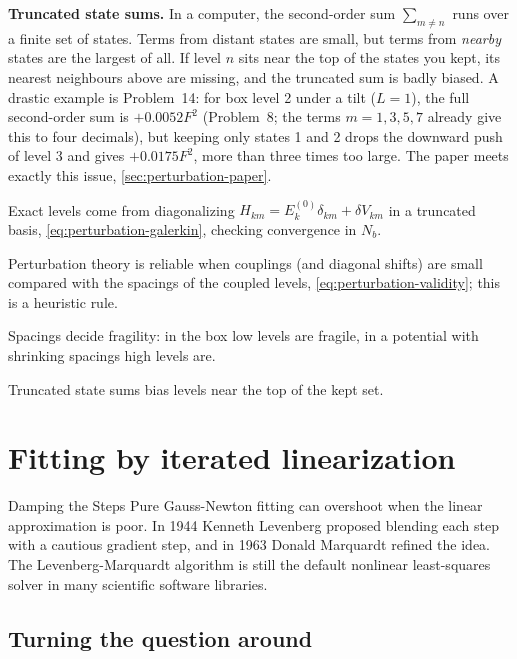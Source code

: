 \begin{pitfall}
\textbf{Truncated state sums.} In a computer, the second-order sum $\sum_{m\ne n}$ runs over a finite set of states. Terms from distant states are small, but terms from \emph{nearby} states are the largest of all. If level $n$ sits near the top of the states you kept, its nearest neighbours above are missing, and the truncated sum is badly biased. A drastic example is Problem~14: for box level 2 under a tilt ($L=1$), the full second-order sum is $+0.0052F^2$ (Problem~8; the terms $m=1,3,5,7$ already give this to four decimals), but keeping only states 1 and 2 drops the downward push of level 3 and gives $+0.0175F^2$, more than three times too large. The paper meets exactly this issue, \cref{sec:perturbation-paper}.
\end{pitfall}

\begin{keyideas}
\item Exact levels come from diagonalizing $H_{km}=E_k^{(0)}\delta_{km}+\delta V_{km}$ in a truncated basis, \cref{eq:perturbation-galerkin}, checking convergence in $N_b$.
\item Perturbation theory is reliable when couplings (and diagonal shifts) are small compared with the spacings of the coupled levels, \cref{eq:perturbation-validity}; this is a heuristic rule.
\item Spacings decide fragility: in the box low levels are fragile, in a potential with shrinking spacings high levels are.
\item Truncated state sums bias levels near the top of the kept set.
\end{keyideas}

\section{Fitting by iterated linearization}\label{sec:perturbation-fitting}
\begin{didyouknow}{Damping the Steps}
Pure Gauss-Newton fitting can overshoot when the linear approximation is poor. In 1944 Kenneth Levenberg proposed blending each step with a cautious gradient step, and in 1963 Donald Marquardt refined the idea. The Levenberg-Marquardt algorithm is still the default nonlinear least-squares solver in many scientific software libraries.
\end{didyouknow}

\subsection{Turning the question around}

